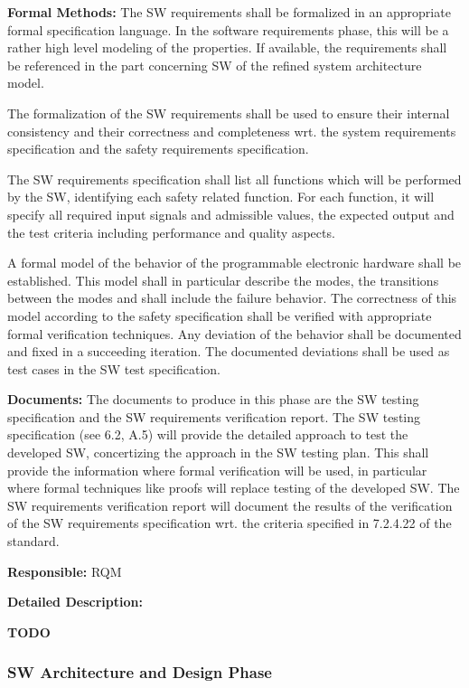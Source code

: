 {\bf Formal Methods:} The SW requirements shall be formalized in an appropriate
formal specification language. In the software requirements phase, this will be
a rather high level modeling of the properties. If available, the requirements
shall be referenced in the part concerning SW of the refined system architecture
model.

The formalization of the SW requirements shall be used to ensure their internal
consistency and their correctness and completeness wrt. the system requirements
specification and the safety requirements specification.

The SW requirements specification shall list all functions which will be
performed by the SW, identifying each safety related function. For each
function, it will specify all required input signals and admissible values, the
expected output and the test criteria including performance and quality aspects.

A formal model of the behavior of the programmable electronic hardware shall be
established. This model shall in particular describe the modes, the transitions
between the modes and shall include the failure behavior. The correctness of
this model according to the safety specification shall be verified with
appropriate formal verification techniques. Any deviation of the behavior shall
be documented and fixed in a succeeding iteration. The documented deviations
shall be used as test cases in the SW test specification.

{\bf Documents:} The documents to produce in this phase are the SW testing
specification and the SW requirements verification report. The SW testing
specification (see 6.2, A.5) will provide the detailed approach to test the
developed SW, concertizing the approach in the SW testing plan. This shall
provide the information where formal verification will be used, in particular
where formal techniques like proofs will replace testing of the developed SW.
The SW requirements verification report will document the results of the
verification of the SW requirements specification wrt. the criteria specified in
7.2.4.22 of the standard.

{\bf Responsible:} RQM

{\bf Detailed Description:}

{\Huge\bf TODO}

\subsubsection{SW Architecture and Design Phase}
\label{sec:sw-arch-design}

